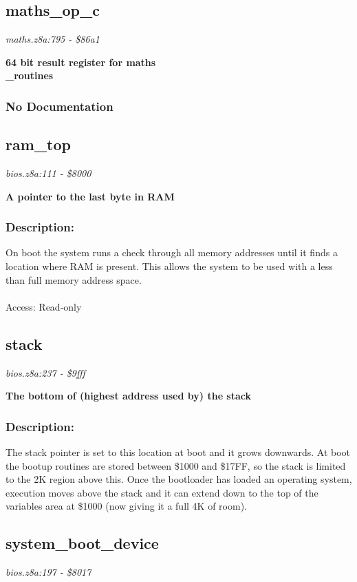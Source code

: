 \subsection{maths\_op\_c}
\textit{maths.z8a:795 - \$86a1}

\noindent
\textbf{64 bit result register for maths\\\_routines}

\subsubsection{No Documentation}


\subsection{ram\_top}
\textit{bios.z8a:111 - \$8000}

\noindent
\textbf{A pointer to the last byte in RAM}

\subsubsection{Description:}
 On boot the system runs a check through all memory addresses until it finds a location where RAM is present.  This allows the system to be used with a less than full memory address space.\\\\ Access: Read-only

\subsection{stack}
\textit{bios.z8a:237 - \$9fff}

\noindent
\textbf{The bottom of (highest address used by) the stack}

\subsubsection{Description:}
 The stack pointer is set to this location at boot and it grows downwards.  At boot the bootup routines are stored between \$1000 and \$17FF, so the stack is limited to the 2K region above this.  Once the bootloader has loaded an operating system, execution moves above the stack and it can extend down to the top of the variables area at \$1000 (now giving it a full 4K of room).

\subsection{system\_boot\_device}
\textit{bios.z8a:197 - \$8017}

